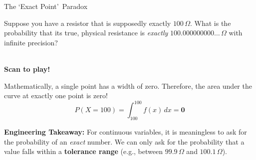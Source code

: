 \begin{frame}{The \lq Exact Point\rq\ Paradox}
    \begin{example}
        \begin{minipage}{0.75\textwidth}
            Suppose you have a resistor that is supposedly exactly $100\,\Omega$. What is the probability that its true, physical resistance is \textit{exactly} $100.000000000\dots\,\Omega$ with infinite precision?
        \end{minipage}%
        \hfill
        \begin{minipage}{0.2\textwidth}
            \centering
             \\
            \vspace{0.1cm}
            \scriptsize \textbf{Scan to play!}
        \end{minipage}
    \end{example}

    \pause 
    \begin{solution}
        Mathematically, a single point has a width of zero. Therefore, the area under the curve at exactly one point is zero!
        \[ P(X = 100) = \int_{100}^{100} f(x) \,dx = \mathbf{0} \]
        
        \textbf{Engineering Takeaway:} For continuous variables, it is meaningless to ask for the probability of an \textit{exact} number. We can only ask for the probability that a value falls within a \textbf{tolerance range} (e.g., between $99.9\,\Omega$ and $100.1\,\Omega$).
    \end{solution}
\end{frame}

